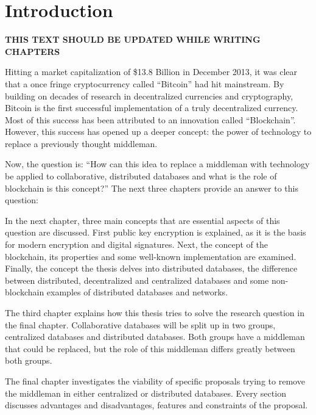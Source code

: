 \chapter{Introduction}

\textbf{THIS TEXT SHOULD BE UPDATED WHILE WRITING CHAPTERS}


Hitting a market capitalization of \$13.8 Billion in December 2013, it was clear that a once fringe cryptocurrency called ``Bitcoin'' had hit mainstream. By building on decades of research in decentralized currencies and cryptography, Bitcoin is the first successful implementation of a truly decentralized currency. Most of this success has been attributed to an innovation called ``Blockchain''. However, this success has opened up a deeper concept: the power of technology to replace a previously thought middleman.


Now, the question is: ``How can this idea to replace a middleman with technology be applied to collaborative, distributed databases and what is the role of blockchain is this concept?'' The next three chapters provide an answer to this question:


In the next chapter, three main concepts that are essential aspects of this question are discussed. First public key encryption is explained, as it is the basis for modern encryption and digital signatures. Next, the concept of the blockchain, its properties and some well-known implementation are examined. Finally, the concept the thesis delves into distributed databases, the difference between distributed, decentralized and centralized databases and some non-blockchain examples of distributed databases and networks.

The third chapter explains how this thesis tries to solve the research question in the final chapter. Collaborative databases will be split up in two groups, centralized databases and distributed databases. Both groups have a middleman that could be replaced, but the role of this middleman differs greatly between both groups. 

The final chapter investigates the viability of specific proposals trying to remove the middleman in either centralized or distributed databases. Every section discusses advantages and disadvantages, features and constraints of the proposal.
